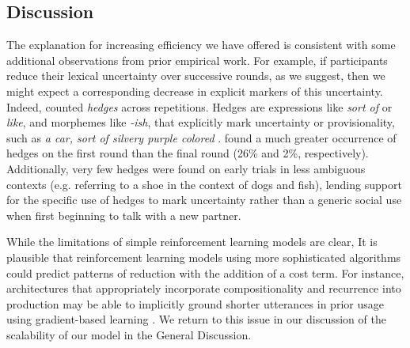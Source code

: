 


\subsection{Discussion}

The explanation for increasing efficiency we have offered is consistent with some additional observations from prior empirical work.
For example, if participants reduce their lexical uncertainty over successive rounds, as we suggest, then we might expect a corresponding decrease in explicit markers of this uncertainty. 
Indeed,  counted \emph{hedges} across repetitions.
Hedges are expressions like \emph{sort of} or \emph{like}, and morphemes like \emph{-ish}, that explicitly mark uncertainty or provisionality, such as \emph{a car, sort of silvery purple colored} \cite{BrennanClark96_ConceptualPactsConversation,Fraser10_Hedging,MedlockBriscoe07_HedgeClassification}.
 found a much greater occurrence of hedges on the first round than the final round (26\% and 2\%, respectively).
Additionally, very few hedges were found on early trials in less ambiguous contexts (e.g. referring to a shoe in the context of dogs and fish), lending support for the specific use of hedges to mark uncertainty rather than a generic social use when first beginning to talk with a new partner.

While the limitations of simple reinforcement learning models are clear, It is plausible that reinforcement learning models using more sophisticated algorithms could predict patterns of reduction with the addition of a cost term.
For instance, architectures that appropriately incorporate compositionality and recurrence into production may be able to implicitly ground shorter utterances in prior usage using gradient-based learning \cite{hawkins2019continual}.
We return to this issue in our discussion of the scalability of our model in the General Discussion.

